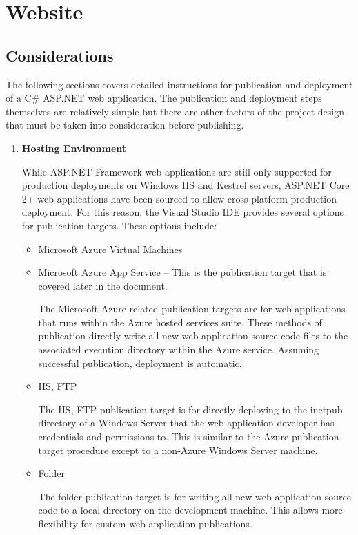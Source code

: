 
\section{Website}
\subsection{Considerations}

\tab The following sections covers detailed instructions for publication and deployment of a C\# ASP.NET web application. The publication and deployment steps themselves are relatively simple but there are other factors of the project design that must be taken into consideration before publishing.  

\begin{enumerate}
    \item \textbf{Hosting Environment}

    \tab While ASP.NET Framework web applications are still only supported for production deployments on Windows IIS and Kestrel servers, ASP.NET Core 2+ web applications have been sourced to allow cross-platform production deployment. For this reason, the Visual Studio IDE provides several options for publication targets. These options include:

    \begin{itemize}
        \item Microsoft Azure Virtual Machines
        \item Microsoft Azure App Service -- This is the publication target that is covered later in the document.
        
        \tab The Microsoft Azure related publication targets are for web applications that  runs within the Azure hosted services suite. These methods of publication directly write all new web application source code files to the associated execution directory within the Azure service.  Assuming successful publication, deployment is automatic.
        
        \item IIS, FTP
        
        \tab The IIS, FTP publication target is for directly deploying to the inetpub directory of a Windows Server that the web application developer has credentials and permissions to.  This is similar to the Azure publication target procedure except to a non-Azure Windows Server machine.
        
        \item Folder
        
        \tab The folder publication target is for writing all new web application source code to a local directory on the development machine. This allows more flexibility for custom web application publications.
    \end{itemize}
\end{enumerate}

